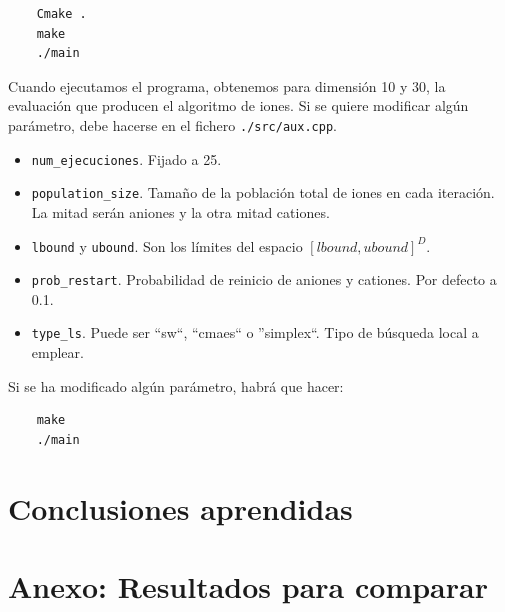 \documentclass[a4paper,11pt]{article}
\begin{document}
\begin{verbatim}
    Cmake .
    make
    ./main
\end{verbatim}

Cuando ejecutamos el programa, obtenemos para dimensión 10 y 30, la evaluación que producen el algoritmo de iones.
Si se quiere modificar algún parámetro, debe hacerse en el fichero \texttt{./src/aux.cpp}. 

\begin{itemize}
 \item \texttt{num\_ejecuciones}. Fijado a 25.
 \item \texttt{population\_size}. Tamaño de la población total de iones en cada iteración. La mitad serán aniones y la otra
 mitad cationes.
 \item \texttt{lbound} y \texttt{ubound}. Son los límites del espacio $[lbound, ubound]^D$.
 \item \texttt{prob\_restart}. Probabilidad de reinicio de aniones y cationes. Por defecto a 0.1.
 \item \texttt{type\_ls}. Puede ser ``sw``, ``cmaes`` o ''simplex``. Tipo de búsqueda local a emplear.
\end{itemize}

Si se ha modificado algún parámetro, habrá que hacer:
\begin{verbatim}
    make
    ./main
\end{verbatim}



\section{Conclusiones aprendidas}

\section{Anexo: Resultados para comparar}
\end{document}
